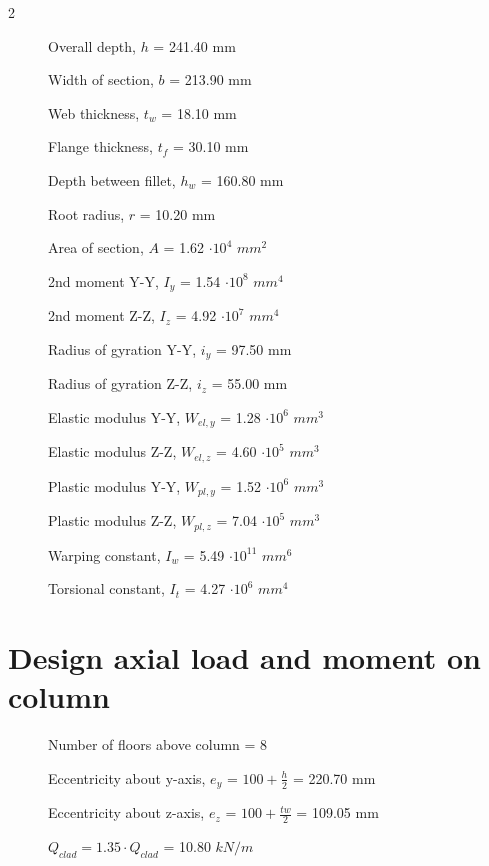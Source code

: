 \documentclass[
  letterpaper,
  DIV=11,
  numbers=noendperiod]{scrartcl}
\begin{document}
\begin{multicols}{2}
\begin{description}
  \item[] Overall depth, $h$ = 241.40 mm  
  \item[] Width of section, $b$ = 213.90 mm  
  \item[] Web thickness, $t_{w}$ = 18.10 mm  
  \item[] Flange thickness, $t_{f}$ = 30.10 mm  
  \item[] Depth between fillet, $h_{w}$ = 160.80 mm  
  \item[] Root radius, $r$ = 10.20 mm  
  \item[] Area of section, $A$ = 1.62 $\cdot 10^{4}$ $mm^{2}$ 
  \item[] 2nd moment Y-Y, $I_{y}$ = 1.54 $\cdot 10^{8}$ $mm^{4}$  
  \item[] 2nd moment Z-Z, $I_{z}$ = 4.92 $\cdot 10^{7}$ $mm^{4}$  
  \item[] Radius of gyration Y-Y, $i_{y}$ = 97.50 mm  
  \item[] Radius of gyration Z-Z, $i_{z}$ = 55.00 mm  
  \item[] Elastic modulus Y-Y, $W_{el,y}$ = 1.28 $\cdot 10^{6}$ $mm^{3}$  
  \item[] Elastic modulus Z-Z, $W_{el,z}$ = 4.60 $\cdot 10^{5}$ $mm^{3}$  
  \item[] Plastic modulus Y-Y, $W_{pl,y}$ = 1.52 $\cdot 10^{6}$ $mm^{3}$  
  \item[] Plastic modulus Z-Z, $W_{pl,z}$ = 7.04 $\cdot 10^{5}$ $mm^{3}$  
  \item[] Warping constant, $I_{w}$ = 5.49 $\cdot 10^{11}$ $mm^{6}$  
  \item[] Torsional constant, $I_{t}$ = 4.27 $\cdot 10^{6}$   $mm^{4}$  
\end{description}
\end{multicols}

\newpage{}

\section{}\label{section-8}

\section{Design axial load and moment on
column}\label{design-axial-load-and-moment-on-column}

\begin{description}
  \item[]Number of floors above column = 8
  \item[]Eccentricity about y-axis, $e_{y}$ = $100 +\frac{h}{2}$ = 220.70 mm
  \item[]Eccentricity about z-axis, $e_{z}$ = $100 +\frac{tw}{2}$ = 109.05 mm
  \item[]$Q_{clad} = 1.35\cdot Q_{clad}$ = 10.80 $kN/m$
\end{description}
\end{document}
